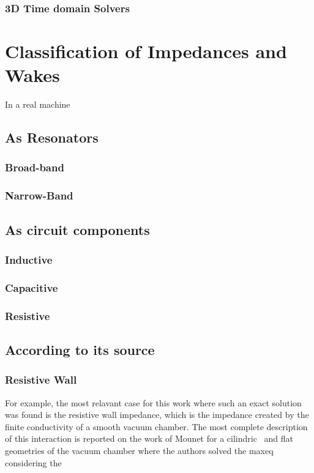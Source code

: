 \subsubsection{3D Time domain Solvers}

\section{Classification of Impedances and Wakes}

    In a real machine
\subsection{As Resonators}
\subsubsection{Broad-band}
\subsubsection{Narrow-Band}
\subsection{As circuit components}
\subsubsection{Inductive}
\subsubsection{Capacitive}
\subsubsection{Resistive}
\subsection{According to its source}
\subsubsection{Resistive Wall}
	For example, the most relavant case for this work where such an exact solution was found is the resistive wall impedance, which is the impedance created by the finite conductivity of a smooth vacuum chamber.
	The most complete description of this interaction is reported on the work of Mounet for a 	cilindric~\cite{Mounet2009} and flat~\cite{Mounet2010} geometries of the vacuum chamber where the authors solved the \gls{maxeq} considering the

